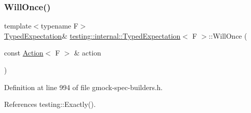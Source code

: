 \subsubsection{\texorpdfstring{Will\+Once()}{WillOnce()}}
{\footnotesize\ttfamily template$<$typename F$>$ \\
\hyperlink{classtesting_1_1internal_1_1TypedExpectation}{Typed\+Expectation}\& \hyperlink{classtesting_1_1internal_1_1TypedExpectation}{testing\+::internal\+::\+Typed\+Expectation}$<$ F $>$\+::Will\+Once (\begin{DoxyParamCaption}\item[{const \hyperlink{classtesting_1_1Action}{Action}$<$ F $>$ \&}]{action }\end{DoxyParamCaption})\hspace{0.3cm}{\ttfamily [inline]}}



Definition at line 994 of file gmock-\/spec-\/builders.\+h.



References testing\+::\+Exactly().



